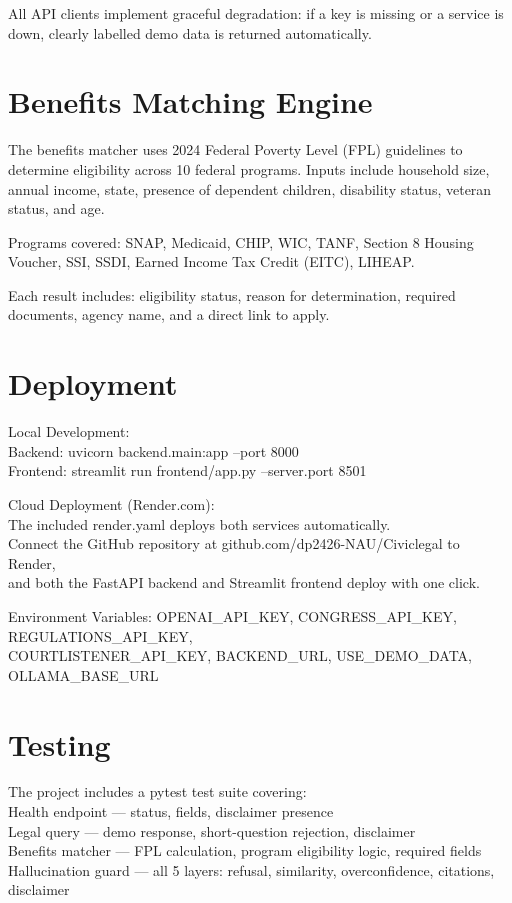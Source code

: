 \documentclass[12pt,a4paper]{article}
\begin{document}
All API clients implement graceful degradation: if a key is missing or a service is down, clearly labelled demo data is returned automatically.

\section{Benefits Matching Engine}
The benefits matcher uses 2024 Federal Poverty Level (FPL) guidelines to determine eligibility across 10 federal programs. Inputs include household size, annual income, state, presence of dependent children, disability status, veteran status, and age.

Programs covered: SNAP, Medicaid, CHIP, WIC, TANF, Section 8 Housing Voucher, SSI, SSDI, Earned Income Tax Credit (EITC), LIHEAP.

Each result includes: eligibility status, reason for determination, required documents, agency name, and a direct link to apply.

\section{Deployment}
Local Development:\\  Backend:  uvicorn backend.main:app --port 8000\\  Frontend: streamlit run frontend/app.py --server.port 8501

Cloud Deployment (Render.com):\\  The included render.yaml deploys both services automatically.\\  Connect the GitHub repository at github.com/dp2426-NAU/Civiclegal to Render,\\  and both the FastAPI backend and Streamlit frontend deploy with one click.

Environment Variables: OPENAI\_API\_KEY, CONGRESS\_API\_KEY, REGULATIONS\_API\_KEY,\\COURTLISTENER\_API\_KEY, BACKEND\_URL, USE\_DEMO\_DATA, OLLAMA\_BASE\_URL

\section{Testing}
The project includes a pytest test suite covering:\\\textbullet{}  Health endpoint — status, fields, disclaimer presence\\\textbullet{}  Legal query — demo response, short-question rejection, disclaimer\\\textbullet{}  Benefits matcher — FPL calculation, program eligibility logic, required fields\\\textbullet{}  Hallucination guard — all 5 layers: refusal, similarity, overconfidence, citations, disclaimer
\end{document}
